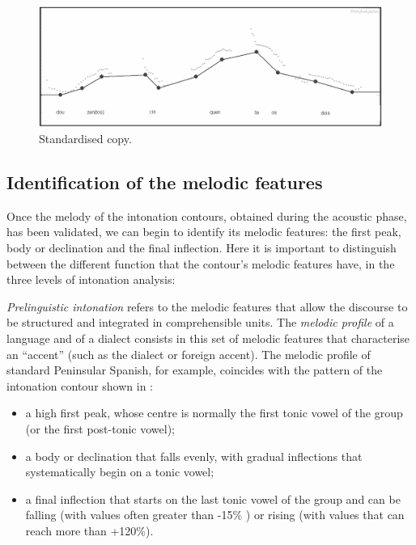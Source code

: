 \documentclass[output=paper]{langscibook}
\begin{document}
\begin{figure}
\includegraphics[width=\textwidth]{figures/FON-img11.PNG}
\caption{Standardised copy.}
\label{graph:font:6}
\end{figure}

\subsection{Identification of the melodic features} 
Once the melody of the intonation contours, obtained during the acoustic phase, has been validated, we can begin to identify its melodic features: the first peak, body or declination and the final inflection. Here it is important to distinguish between the different function that the contour's melodic features have, in the three levels of intonation analysis:


\textit{Prelinguistic intonation} refers to the melodic features that allow the discourse to be structured and integrated in comprehensible units. The \textit{melodic profile} \citep{CanteroSerena.2011} of a language and of a dialect consists in this set of melodic features that characterise an ``accent'' (such as the dialect or foreign accent). The melodic profile of standard Peninsular Spanish, for example, coincides with the pattern of the intonation contour shown in :


\begin{itemize}
\item a high first peak, whose centre is normally the first tonic vowel of the group (or the first post-tonic vowel);
\item a body or declination that falls evenly, with gradual inflections that systematically begin on a tonic vowel;
\item a final inflection that starts on the last tonic vowel of the group and can be falling (with values often greater than -15\%  ) or rising (with values that can reach more than +120\%). 
\end{itemize}
\end{document}
